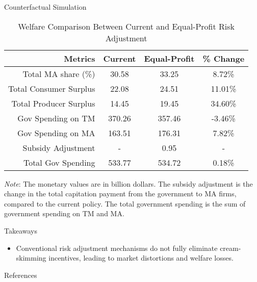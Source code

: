 \documentclass{beamer}
\begin{document}
\begin{frame}[t]
\begin{columns}[t]
\begin{column}{.25 \textwidth}
\begin{block}{Counterfactual Simulation}
        \begin{table}[ht]
          \small
          \centering
          \caption{Welfare Comparison Between Current and Equal-Profit Risk Adjustment}
          \label{tab:counterfactual}
          \begin{threeparttable}
            \renewcommand{\arraystretch}{1.2}
            \begin{tabular}{@{}rccc@{}}
              \toprule
              \textbf{Metrics} & \textbf{Current} & \textbf{Equal-Profit} & \textbf{\% Change} \\ \midrule
              Total MA share (\%) & 30.58 & 33.25 & 8.72\% \\
              Total Consumer Surplus & 22.08 & 24.51 & 11.01\% \\
              Total Producer Surplus & 14.45 & 19.45 & 34.60\% \\
              Gov Spending on TM & 370.26 & 357.46 & -3.46\% \\
              Gov Spending on MA & 163.51 & 176.31 & 7.82\% \\
              Subsidy Adjustment & - & 0.95 & - \\
              Total Gov Spending & 533.77 & 534.72 & 0.18\% \\
              \bottomrule
            \end{tabular}
            \begin{tablenotes}
              \footnotesize
              \textit{Note}: The monetary values are in billion dollars. The subsidy adjustment is the change in the total capitation payment from the government to MA firms, compared to the current policy. The total government spending is the sum of government spending on TM and MA.
            \end{tablenotes}
          \end{threeparttable}
        \end{table}
      \end{block}
      \begin{block}{Takeaways}
        \begin{itemize}
          \item Conventional risk adjustment mechanisms do not fully eliminate cream-skimming incentives, leading to market distortions and welfare losses.
        \end{itemize}
      \end{block}
      \begin{block}{References}
      \end{block}

    \end{column}
  
  \end{columns}
\end{frame}
\end{document}
